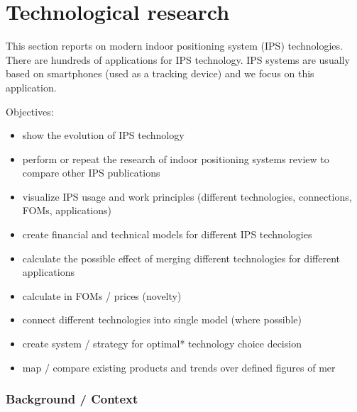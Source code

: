 \chapter{Technological research}
\label{cap:TechResearch}

This section reports on modern indoor positioning system (IPS) technologies.
There are hundreds of applications for IPS technology. IPS systems are usually based on smartphones (used as a tracking device) and we focus on this application. 

Objectives:
\begin{itemize}
	\item show the evolution of IPS technology
	\item perform or repeat the research of indoor positioning systems review to compare other IPS publications
	\item visualize IPS usage and work principles (different technologies, connections, FOMs, applications)
	\item create financial and technical models for different IPS technologies
	\item calculate the possible effect of merging different technologies for different applications
	\item calculate in FOMs / prices (novelty)
	\item connect different technologies into single model (where possible)
	\item create system / strategy for optimal* technology choice decision
	\item map / compare existing products and trends over defined figures of mer
\end{itemize}







\subsection{Background / Context}

